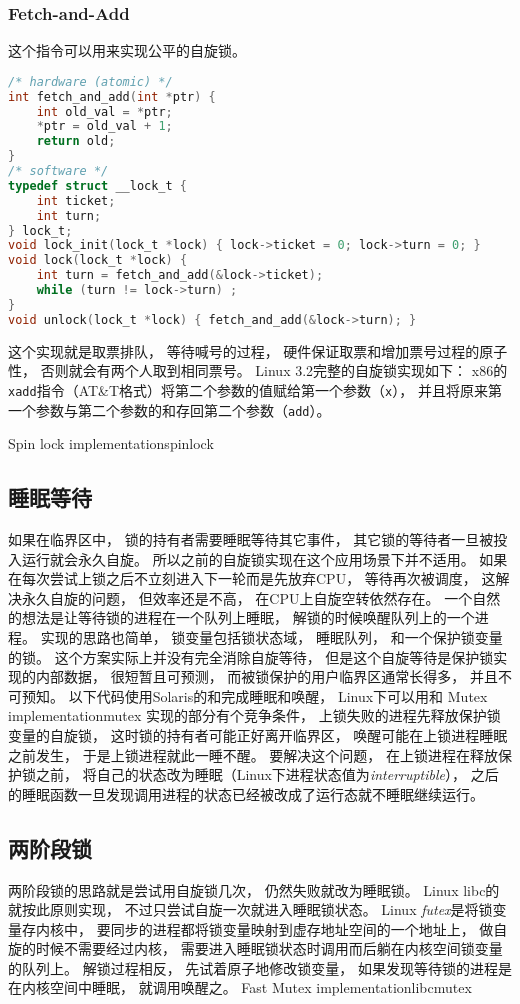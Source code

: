 \subsubsection{Fetch-and-Add}
这个指令可以用来实现公平的自旋锁。
\begin{lstlisting}[language=C]
/* hardware (atomic) */
int fetch_and_add(int *ptr) {
	int old_val = *ptr;
	*ptr = old_val + 1;
	return old;
}
/* software */
typedef struct __lock_t {
	int ticket;
	int turn;
} lock_t;
void lock_init(lock_t *lock) { lock->ticket = 0; lock->turn = 0; }
void lock(lock_t *lock) {
	int turn = fetch_and_add(&lock->ticket);
	while (turn != lock->turn) ;
}
void unlock(lock_t *lock) { fetch_and_add(&lock->turn); }
  \end{lstlisting}
这个实现就是取票排队，
等待喊号的过程，
硬件保证取票和增加票号过程的原子性，
否则就会有两个人取到相同票号。
Linux 3.2完整的自旋锁实现如下：
x86的\verb|xadd|指令（AT\&T格式）将第二个参数的值赋给第一个参数（\verb|x|），
并且将原来第一个参数与第二个参数的和存回第二个参数（\verb|add|）。

              {Spin lock implementation}{spinlock}

\subsection{睡眠等待}
如果在临界区中，
锁的持有者需要睡眠等待其它事件，
其它锁的等待者一旦被投入运行就会永久自旋。
所以之前的自旋锁实现在这个应用场景下并不适用。
如果在每次尝试上锁之后不立刻进入下一轮而是先放弃CPU，
等待再次被调度，
这解决永久自旋的问题，
但效率还是不高，
在CPU上自旋空转依然存在。
一个自然的想法是让等待锁的进程在一个队列上睡眠，
解锁的时候唤醒队列上的一个进程。
实现的思路也简单，
锁变量包括锁状态域，
睡眠队列，
和一个保护锁变量的锁。
这个方案实际上并没有完全消除自旋等待，
但是这个自旋等待是保护锁实现的内部数据，
很短暂且可预测，
而被锁保护的用户临界区通常长得多，
并且不可预知。
以下代码使用Solaris的和完成睡眠和唤醒，
Linux下可以用和
              {Mutex implementation}{mutex}
实现的部分有个竞争条件，
上锁失败的进程先释放保护锁变量的自旋锁，
这时锁的持有者可能正好离开临界区，
唤醒可能在上锁进程睡眠之前发生，
于是上锁进程就此一睡不醒。
要解决这个问题，
在上锁进程在释放保护锁之前，
将自己的状态改为睡眠（Linux下进程状态值为{\em interruptible}），
之后的睡眠函数一旦发现调用进程的状态已经被改成了运行态就不睡眠继续运行。

\subsection{两阶段锁}
两阶段锁的思路就是尝试用自旋锁几次，
仍然失败就改为睡眠锁。
Linux libc的就按此原则实现，
不过只尝试自旋一次就进入睡眠锁状态。
Linux {\em futex}是将锁变量存内核中，
要同步的进程都将锁变量映射到虚存地址空间的一个地址上，
做自旋的时候不需要经过内核，
需要进入睡眠锁状态时调用而后躺在内核空间锁变量的队列上。
解锁过程相反，
先试着原子地修改锁变量，
如果发现等待锁的进程是在内核空间中睡眠，
就调用唤醒之。
              {Fast Mutex implementation}{libcmutex}

